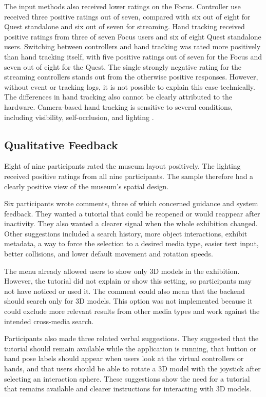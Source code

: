The input methods also received lower ratings on the Focus. Controller use received three positive ratings out of seven, compared with six out of eight for Quest standalone and six out of seven for streaming. Hand tracking received positive ratings from three of seven Focus users and six of eight Quest standalone users. Switching between controllers and hand tracking was rated more positively than hand tracking itself, with five positive ratings out of seven for the Focus and seven out of eight for the Quest. The single strongly negative rating for the streaming controllers stands out from the otherwise positive responses. However, without event or tracking logs, it is not possible to explain this case technically. The differences in hand tracking also cannot be clearly attributed to the hardware. Camera-based hand tracking is sensitive to several conditions, including visibility, self-occlusion, and lighting \citep{metaGestureDesign2026}.

\subsection{Qualitative Feedback}

Eight of nine participants rated the museum layout positively. The lighting received positive ratings from all nine participants. The sample therefore had a clearly positive view of the museum's spatial design.

Six participants wrote comments, three of which concerned guidance and system feedback. They wanted a tutorial that could be reopened or would reappear after inactivity. They also wanted a clearer signal when the whole exhibition changed. Other suggestions included a search history, more object interactions, exhibit metadata, a way to force the selection to a desired media type, easier text input, better collisions, and lower default movement and rotation speeds.

The menu already allowed users to show only 3D models in the exhibition. However, the tutorial did not explain or show this setting, so participants may not have noticed or used it. The comment could also mean that the backend should search only for 3D models. This option was not implemented because it could exclude more relevant results from other media types and work against the intended cross-media search.

Participants also made three related verbal suggestions. They suggested that the tutorial should remain available while the application is running, that button or hand pose labels should appear when users look at the virtual controllers or hands, and that users should be able to rotate a 3D model with the joystick after selecting an interaction sphere. These suggestions show the need for a tutorial that remains available and clearer instructions for interacting with 3D models.

